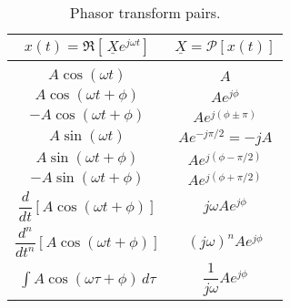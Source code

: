 \documentclass{report}
\begin{document}
\begin{table}[hbt!]
    \centering
    \caption{Phasor transform pairs.}
    \label{phasor_pairs}
    \begin{tabular}{|c|c|}
        \hline
        $x(t)=\Re[\,\underline{X}e^{j\omega t}]$ & $\underline{X} = \mathcal{P}[x(t)]$ \\[0.15cm]
        \hline
        & \\[0.1cm]
        $A\cos(\omega t)$ & $A$ \\[0.5cm]
        $A\cos(\omega t+\phi)$ & $Ae^{j\phi}$ \\[0.5cm]
        $-A\cos(\omega t+\phi)$ & $Ae^{j(\phi\pm\pi)}$ \\[0.5cm]
        $A\sin(\omega t)$ & $Ae^{-j\pi/2}=-jA$ \\[0.5cm]
        $A\sin(\omega t+\phi)$ & $Ae^{j(\phi-\pi/2)}$ \\[0.5cm]
        $-A\sin(\omega t+\phi)$ & $Ae^{j(\phi+\pi/2)}$ \\[0.5cm]
        $\dfrac{d}{dt}\left[A\cos(\omega t+\phi)\right]$ & $j\omega Ae^{j\phi}$ \\[0.5cm]
        $\dfrac{d^n}{dt^n}\left[A\cos(\omega t+\phi)\right]$ & $(j\omega)^n Ae^{j\phi}$ \\[0.5cm]
        $\displaystyle\int A\cos(\omega \tau+\phi)\,d\tau$ & $\dfrac{1}{j\omega} Ae^{j\phi}$ \\[0.5cm]
        \hline
    \end{tabular}
\end{table}
\end{document}
